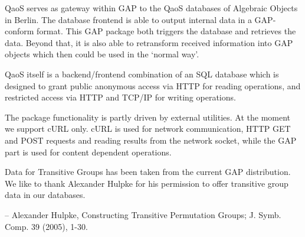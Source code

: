 


QaoS serves as gateway within GAP to the QaoS databases of Algebraic Objects
in Berlin.  The database frontend is able to output internal data in a
GAP-conform format.  This GAP package both triggers the database and retrieves
the data.  Beyond that, it is also able to retransform received information into
GAP objects which then could be used in the `normal way'.

QaoS itself is a backend/frontend combination of an SQL database which is
designed to grant public anonymous access via HTTP for reading operations, and
restricted access via HTTP and TCP/IP for writing operations.

The package functionality is partly driven by external utilities.  At the moment
we support cURL only.  cURL is used for network communication, HTTP GET and POST
requests and reading results from the network socket, while the GAP part is used
for content dependent operations.

Data for Transitive Groups has been taken from the current GAP distribution.  We
like to thank Alexander Hulpke for his permission to offer transitive group data
in our databases.

\beginlist
\item{--}
Alexander Hulpke,
Constructing Transitive Permutation Groups;
J. Symb. Comp. 39 (2005), 1-30.
\endlist




